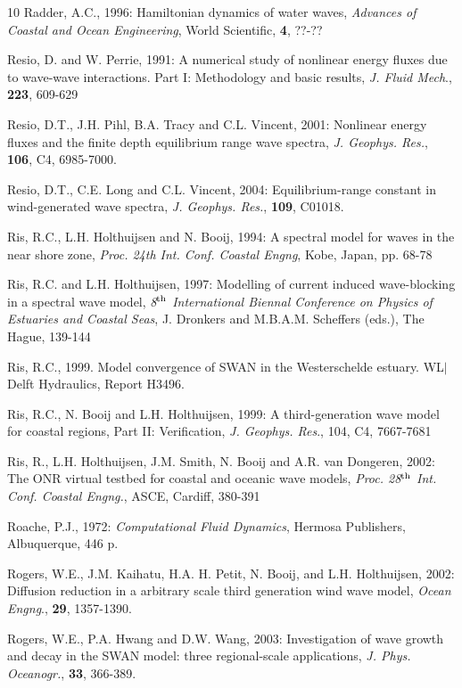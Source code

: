 \documentclass[12pt]{book}
\begin{document}
\begin{thebibliography}{10}
Radder, A.C., 1996: Hamiltonian dynamics of water waves, {\it Advances of Coastal and Ocean Engineering},
World Scientific, {\bf 4}, ??-??

Resio, D. and W. Perrie, 1991: A numerical study of nonlinear energy fluxes due to wave-wave
interactions. Part I: Methodology and basic results, {\it J. Fluid Mech}., {\bf 223}, 609-629

Resio, D.T., J.H. Pihl, B.A. Tracy and C.L. Vincent, 2001: Nonlinear energy fluxes and  the finite depth equilibrium
range wave spectra, {\it J. Geophys. Res.}, {\bf 106}, C4, 6985-7000.

Resio, D.T., C.E. Long and C.L. Vincent, 2004: Equilibrium-range constant in wind-generated wave spectra,
{\it J. Geophys. Res.}, {\bf 109}, C01018.

Ris, R.C., L.H. Holthuijsen and N. Booij, 1994: A spectral model for waves in the near shore zone, {\it Proc.
24th Int. Conf. Coastal Engng}, Kobe, Japan, pp. 68-78

Ris, R.C. and L.H. Holthuijsen, 1997: Modelling of current induced wave-blocking in a spectral wave
model, {\it 8$^{{\rm th}}$ International Biennal Conference on  Physics of Estuaries and Coastal Seas}, J.
Dronkers and M.B.A.M. Scheffers (eds.), The Hague, 139-144

Ris, R.C., 1999. Model convergence of SWAN in the Westerschelde estuary.
WL$\vert$Delft Hydraulics, Report H3496.

Ris, R.C., N. Booij and L.H. Holthuijsen, 1999: A third-generation wave model for coastal regions, Part II:
Verification,  {\it J. Geophys. Res}., 104, C4, 7667-7681

Ris, R., L.H. Holthuijsen, J.M. Smith, N. Booij and A.R. van Dongeren, 2002: The ONR virtual testbed
for coastal and oceanic wave models, {\it Proc. 28$^{{\rm th}}$ Int. Conf. Coastal Engng.}, ASCE, Cardiff, 380-391

Roache, P.J., 1972: {\it Computational Fluid Dynamics}, Hermosa Publishers, Albuquerque, 446 p.

Rogers, W.E., J.M. Kaihatu, H.A. H. Petit, N. Booij, and L.H. Holthuijsen, 2002: Diffusion reduction in a
arbitrary scale third generation wind wave model, {\it Ocean Engng}., {\bf 29}, 1357-1390.

Rogers, W.E., P.A. Hwang and D.W. Wang, 2003: Investigation of wave growth and decay in the SWAN model:
three regional-scale applications, {\it J. Phys. Oceanogr.}, {\bf 33}, 366-389.


\end{thebibliography}
\end{document}
